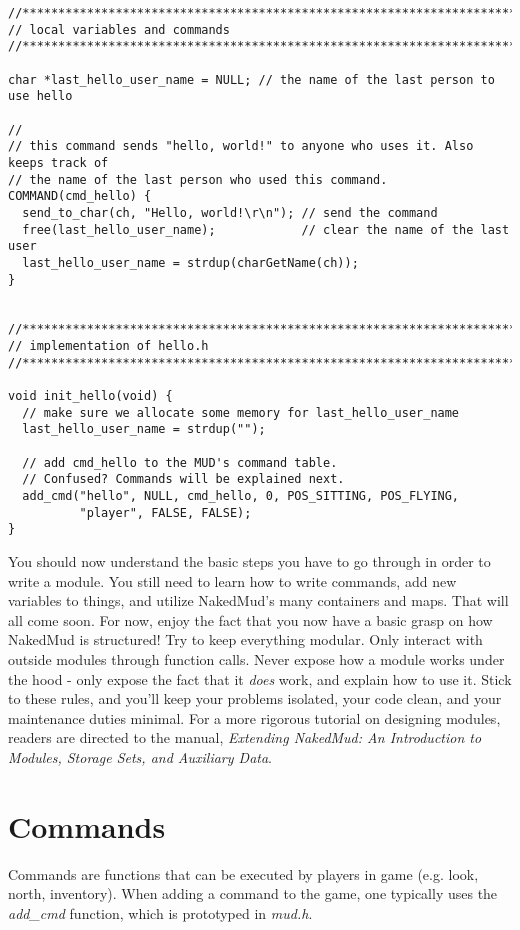 \documentclass[fignum,doc]{article}
\begin{document}
\begin{doublespace}
\begin{singlespace}
\begin{verbatim}
//******************************************************************************
// local variables and commands
//******************************************************************************

char *last_hello_user_name = NULL; // the name of the last person to use hello

//
// this command sends "hello, world!" to anyone who uses it. Also keeps track of
// the name of the last person who used this command.
COMMAND(cmd_hello) {
  send_to_char(ch, "Hello, world!\r\n"); // send the command
  free(last_hello_user_name);            // clear the name of the last user
  last_hello_user_name = strdup(charGetName(ch));
}


//******************************************************************************
// implementation of hello.h
//******************************************************************************

void init_hello(void) {
  // make sure we allocate some memory for last_hello_user_name
  last_hello_user_name = strdup("");
  
  // add cmd_hello to the MUD's command table. 
  // Confused? Commands will be explained next.
  add_cmd("hello", NULL, cmd_hello, 0, POS_SITTING, POS_FLYING,
          "player", FALSE, FALSE);
}

\end{verbatim} \end{singlespace}
You should now understand the basic steps you have to go through in order to write a module. You still need to learn how to write commands, add new variables to things, and utilize NakedMud's many containers and maps. That will all come soon. For now, enjoy the fact that you now have a basic grasp on how NakedMud is structured! Try to keep everything modular. Only interact with outside modules through function calls. Never expose how a module works under the hood - only expose the fact that it {\it does} work, and explain how to use it. Stick to these rules, and you'll keep your problems isolated, your code clean, and your maintenance duties minimal. For a more rigorous tutorial on designing modules, readers are directed to the manual, {\it Extending NakedMud: An Introduction to Modules, Storage Sets, and Auxiliary Data}.



\section{Commands}
Commands are functions that can be executed by players in game (e.g. look, north, inventory). When adding a command to the game, one typically uses the {\it add\_cmd} function, which is prototyped in {\it mud.h}. 




\end{doublespace}
\end{document}
